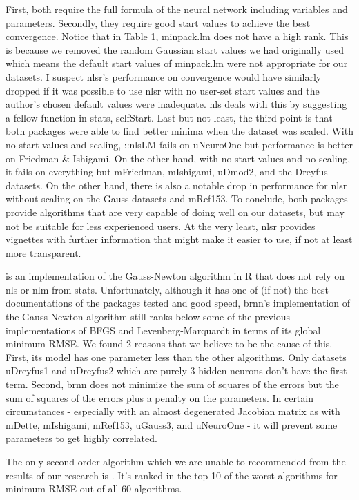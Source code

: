 First, both require the full formula of the neural network including
variables and parameters. Secondly, they require good start values to
achieve the best convergence. Notice that in Table 1, minpack.lm does
not have a high rank. This is because we removed the random Gaussian
start values we had originally used which means the default start values
of minpack.lm were not appropriate for our datasets. I suspect nlsr's
performance on convergence would have similarly dropped if it was
possible to use nlsr with no user-set start values and the author's
chosen default values were inadequate. nls deals with this by suggesting
a fellow function in stats, selfStart. Last but not least, the third
point is that both packages were able to find better minima when the
dataset was scaled. With no start values and scaling, ::nlsLM fails on
uNeuroOne but performance is better on Friedman \& Ishigami. On the
other hand, with no start values and no scaling, it fails on everything
but mFriedman, mIshigami, uDmod2, and the Dreyfus datasets. On the other
hand, there is also a notable drop in performance for nlsr without
scaling on the Gauss datasets and mRef153. To conclude, both packages
provide algorithms that are very capable of doing well on our datasets,
but may not be suitable for less experienced users. At the very least,
nlsr provides vignettes with further information that might make it
easier to use, if not at least more transparent.

 \citep{R-brnn} is an implementation of the Gauss-Newton
algorithm in R that does not rely on nls or nlm from stats.
Unfortunately, although it has one of (if not) the best documentations
of the packages tested and good speed, brnn's implementation of the
Gauss-Newton algorithm still ranks below some of the previous
implementations of BFGS and Levenberg-Marquardt in terms of its global
minimum RMSE. We found 2 reasons that we believe to be the cause of
this. First, its model has one parameter less than the other algorithms.
Only datasets uDreyfus1 and uDreyfus2 which are purely 3 hidden neurons
don't have the first term. Second, brnn does not minimize the sum of
squares of the errors but the sum of squares of the errors plus a
penalty on the parameters. In certain circumstances - especially with an
almost degenerated Jacobian matrix as with mDette, mIshigami, mRef153,
uGauss3, and uNeuroOne - it will prevent some parameters to get highly
correlated.

The only second-order algorithm which we are unable to recommended from
the results of our research is  \citep{R-snnR}. It's
ranked in the top 10 of the worst algorithms for minimum RMSE out of all
60 algorithms.

